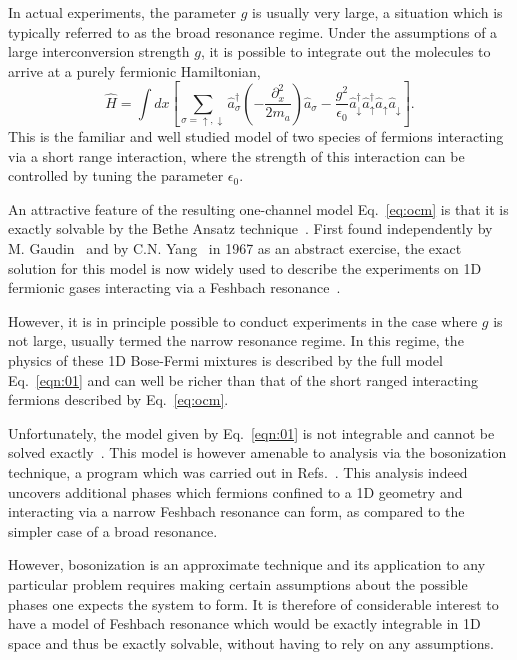 \documentclass[aps,pra,
superscriptaddress,
reprint,twocolumn,preprintnumbers,
amsmath,amssymb,
nofootinbib]{revtex4-1}
\begin{document}
In actual experiments, the parameter $g$ is usually very large, a situation which is typically referred to as the broad resonance regime. Under the assumptions of a large interconversion strength $g$, it is possible to integrate out the molecules to arrive at a purely fermionic Hamiltonian,
\begin{equation} \label{eq:ocm}  \hat H = \int dx \left[ \sum_{\sigma=\uparrow, \downarrow} \hat{a}_\sigma^\dagger \left(- \frac{\partial^2_x }{2m_a} \right) \hat{a}_\sigma - \frac{g^2}{\epsilon_0} \hat{a}^\dagger_{\downarrow}
\hat{a}^\dagger_{\uparrow} \hat{a}_\uparrow \hat{a}_\downarrow
\right].
\end{equation}
This is the familiar and well studied model of two species of fermions interacting via a short range interaction, where the strength of this interaction can be controlled by tuning the parameter $\epsilon_0$. 

An attractive feature of the resulting one-channel model Eq.~\eqref{eq:ocm} is that it is exactly solvable by the Bethe Ansatz technique~\cite{Bethe1931}. First found independently by M. Gaudin~\cite{Gaudin1967a,Gaudin1967b} and by C.N. Yang~\cite{Yang1967} in 1967 as an abstract exercise, the exact solution for this model is now widely used to describe the experiments on 1D fermionic gases interacting via a Feshbach resonance~\cite{Fuchs2004,Tokatly2004}.

However, it is in principle possible to conduct experiments in the case where $g$ is not large, usually termed the narrow resonance regime. In this regime, the physics of these 1D Bose-Fermi mixtures is described by 
the full model Eq.~\eqref{eqn:01} and can well be richer than that of the short ranged interacting fermions described by Eq.~\eqref{eq:ocm}. 

Unfortunately, the model given by Eq.~\eqref{eqn:01} is not integrable and cannot be solved exactly~\cite{Gurarie2006}. This model is however amenable to analysis via the bosonization technique, a program which was carried out in Refs.~\cite{Sheehy2005, Citro2006}. This analysis indeed uncovers additional phases which fermions confined to a 1D geometry and interacting via a narrow Feshbach resonance can form, as compared to the simpler case of a broad resonance. 

However, bosonization is an approximate technique and its application to any particular problem requires making certain assumptions about the possible phases one expects the system to form. It is therefore of considerable interest to have a model of Feshbach resonance which would be exactly integrable in 1D space and thus be exactly solvable, without having to rely on any assumptions. 
\end{document}
